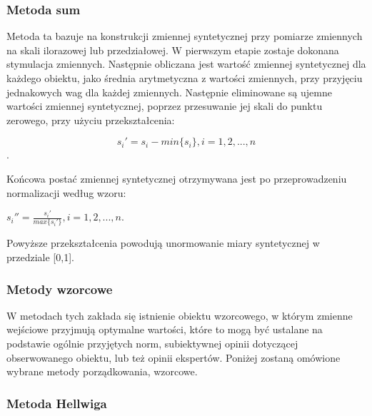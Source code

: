 \documentclass[12pt,a4paper]{report}
\begin{document}
\subsubsection{Metoda sum}
\noindent


Metoda ta bazuje na konstrukcji zmiennej syntetycznej przy pomiarze zmiennych na skali ilorazowej lub przedziałowej. W pierwszym etapie zostaje dokonana stymulacja zmiennych. Następnie obliczana jest wartość zmiennej syntetycznej dla każdego obiektu, jako średnia arytmetyczna z wartości zmiennych, przy przyjęciu jednakowych wag dla każdej zmiennych. Następnie eliminowane są ujemne wartości zmiennej syntetycznej, poprzez przesuwanie jej skali do punktu zerowego, przy użyciu przekształcenia:
\begin{center}
$$s_{i}'=s_{i}-min\{s_i\}, i=1, 2, ..., n$$.\\
\end{center}

Końcowa postać zmiennej syntetycznej otrzymywana jest po przeprowadzeniu normalizacji według wzoru:
\begin{center}
$s_{i}''=\frac{s_{i}'}{max\{s_{i}'\}}, i=1, 2, ..., n$.\\
\end{center}
Powyższe przekształcenia powodują unormowanie miary syntetycznej w przedziale [0,1].
\newpage

\subsubsection{Metody wzorcowe}
\noindent

W metodach tych zakłada się istnienie obiektu wzorcowego, w którym zmienne wejściowe przyjmują optymalne wartości, które to mogą być ustalane na podstawie ogólnie przyjętych norm, subiektywnej opinii dotyczącej obserwowanego obiektu, lub też opinii ekspertów. Poniżej zostaną omówione wybrane metody porządkowania, wzorcowe.

\subsubsection{Metoda Hellwiga}
\noindent
\end{document}
